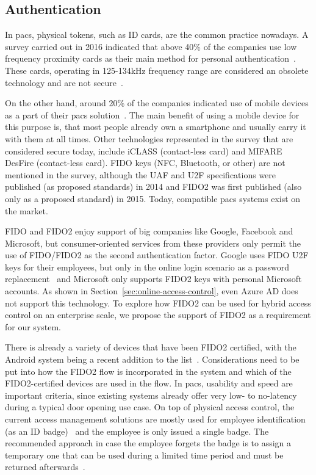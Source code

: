 \subsection{Authentication}\label{sec:analysis-authentication}
In \acrshort{pacs}, physical tokens, such as ID cards, are the common practice nowadays. A survey carried out in 2016 indicated that above 40\% of the companies use low frequency proximity cards as their main method for personal authentication~\cite{HIDGlobal2017TheEnterprise}. These cards, operating in 125-134kHz frequency range are considered an obsolete technology and are not secure~\cite{Hakamaki2015SecurityTechnology}. 

On the other hand, around 20\% of the companies indicated use of mobile devices as a part of their \acrshort{pacs} solution~\cite{HIDGlobal2017TheEnterprise}. The main benefit of using a mobile device for this purpose is, that most people already own a smartphone and usually carry it with them at all times. Other technologies represented in the survey that are considered secure today, include iCLASS (contact-less card) and MIFARE DesFire (contact-less card). FIDO keys (NFC, Bluetooth, or other) are not mentioned in the survey, although the UAF and U2F specifications were published (as proposed standards) in 2014 and FIDO2 was first published (also only as a proposed standard) in 2015. Today, compatible \acrshort{pacs} systems exist on the market\footnotemark. 

FIDO and FIDO2 enjoy support of big companies like Google, Facebook and Microsoft, but consumer-oriented services from these providers only permit the use of FIDO/FIDO2 as the second authentication factor. Google uses FIDO U2F keys for their employees, but only in the online login scenario as a password replacement~\cite{Krebs2018Google:Phishing} and Microsoft only supports FIDO2 keys with personal Microsoft accounts. As shown in Section~\ref{sec:online-access-control}, even Azure AD does not support this technology. To explore how FIDO2 can be used for hybrid access control on an enterprise scale, we propose the support of FIDO2 as a requirement for our system.
% 

There is already a variety of devices that have been FIDO2 certified, with the Android system being a recent addition to the list~\cite{FIDOAlliance2019AndroidPasswords}. Considerations need to be put into how the FIDO2 flow is incorporated in the system and which of the FIDO2-certified devices are used in the flow. In \acrshort{pacs}, usability and speed are important criteria, since existing systems already offer very low- to no-latency during a typical door opening use case. On top of physical access control, the current access management solutions are mostly used for employee identification (as an ID badge)~\cite{HIDGlobal2017TheEnterprise} and the employee is only issued a single badge. The recommended approach in case the employee forgets the badge is to assign a temporary one that can be used during a limited time period and must be returned afterwards~\cite{Ryan2018HowBadges}.

